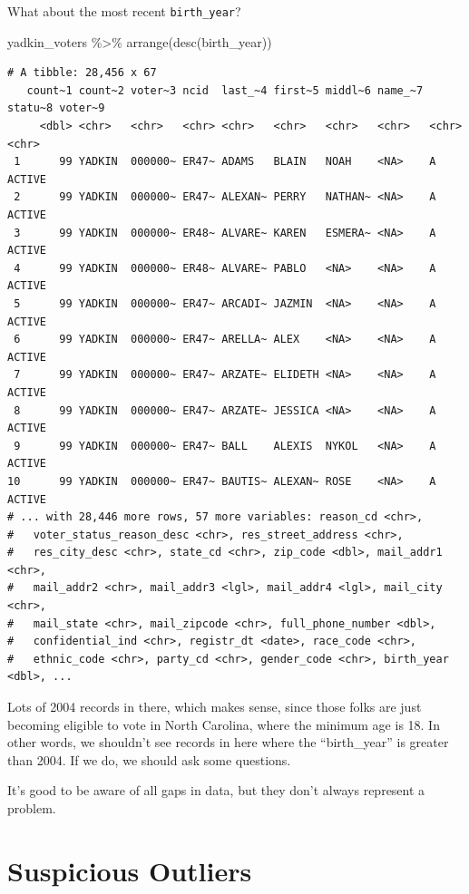 \documentclass[
  letterpaper,
  DIV=11,
  numbers=noendperiod]{scrreprt}
\newenvironment{Shaded}{\begin{snugshade}}{\end{snugshade}}
\newcommand{\FunctionTok}[1]{\textcolor[rgb]{0.28,0.35,0.67}{#1}}
\newcommand{\NormalTok}[1]{\textcolor[rgb]{0.00,0.23,0.31}{#1}}
\newcommand{\SpecialCharTok}[1]{\textcolor[rgb]{0.37,0.37,0.37}{#1}}
\begin{document}
What about the most recent \texttt{birth\_year}?

\begin{Shaded}
\begin{Highlighting}[]
\NormalTok{yadkin\_voters }\SpecialCharTok{\%\textgreater{}\%} \FunctionTok{arrange}\NormalTok{(}\FunctionTok{desc}\NormalTok{(birth\_year))}
\end{Highlighting}
\end{Shaded}

\begin{verbatim}
# A tibble: 28,456 x 67
   count~1 count~2 voter~3 ncid  last_~4 first~5 middl~6 name_~7 statu~8 voter~9
     <dbl> <chr>   <chr>   <chr> <chr>   <chr>   <chr>   <chr>   <chr>   <chr>  
 1      99 YADKIN  000000~ ER47~ ADAMS   BLAIN   NOAH    <NA>    A       ACTIVE 
 2      99 YADKIN  000000~ ER47~ ALEXAN~ PERRY   NATHAN~ <NA>    A       ACTIVE 
 3      99 YADKIN  000000~ ER48~ ALVARE~ KAREN   ESMERA~ <NA>    A       ACTIVE 
 4      99 YADKIN  000000~ ER48~ ALVARE~ PABLO   <NA>    <NA>    A       ACTIVE 
 5      99 YADKIN  000000~ ER47~ ARCADI~ JAZMIN  <NA>    <NA>    A       ACTIVE 
 6      99 YADKIN  000000~ ER47~ ARELLA~ ALEX    <NA>    <NA>    A       ACTIVE 
 7      99 YADKIN  000000~ ER47~ ARZATE~ ELIDETH <NA>    <NA>    A       ACTIVE 
 8      99 YADKIN  000000~ ER47~ ARZATE~ JESSICA <NA>    <NA>    A       ACTIVE 
 9      99 YADKIN  000000~ ER47~ BALL    ALEXIS  NYKOL   <NA>    A       ACTIVE 
10      99 YADKIN  000000~ ER47~ BAUTIS~ ALEXAN~ ROSE    <NA>    A       ACTIVE 
# ... with 28,446 more rows, 57 more variables: reason_cd <chr>,
#   voter_status_reason_desc <chr>, res_street_address <chr>,
#   res_city_desc <chr>, state_cd <chr>, zip_code <dbl>, mail_addr1 <chr>,
#   mail_addr2 <chr>, mail_addr3 <lgl>, mail_addr4 <lgl>, mail_city <chr>,
#   mail_state <chr>, mail_zipcode <chr>, full_phone_number <dbl>,
#   confidential_ind <chr>, registr_dt <date>, race_code <chr>,
#   ethnic_code <chr>, party_cd <chr>, gender_code <chr>, birth_year <dbl>, ...
\end{verbatim}

Lots of 2004 records in there, which makes sense, since those folks are
just becoming eligible to vote in North Carolina, where the minimum age
is 18. In other words, we shouldn't see records in here where the
``birth\_year'' is greater than 2004. If we do, we should ask some
questions.

It's good to be aware of all gaps in data, but they don't always
represent a problem.

\hypertarget{suspicious-outliers}{%
\section{Suspicious Outliers}\label{suspicious-outliers}}
\end{document}
